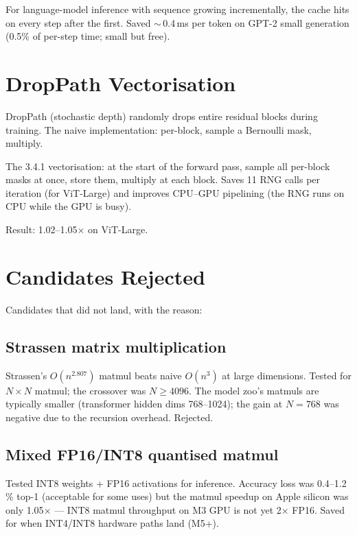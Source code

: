 For language-model inference with sequence growing
incrementally, the cache hits on every step after the first.
Saved $\sim$\,0.4\,ms per token on GPT-2 small generation
(0.5\% of per-step time; small but free).

\section{DropPath Vectorisation}
\label{sec:no_compile_sweep:droppath_vec}

DropPath (stochastic depth) randomly drops entire residual
blocks during training. The naive implementation: per-block,
sample a Bernoulli mask, multiply.

The 3.4.1 vectorisation: at the start of the forward pass,
sample all per-block masks at once, store them, multiply at
each block. Saves 11 RNG calls per iteration (for ViT-Large)
and improves CPU--GPU pipelining (the RNG runs on CPU while
the GPU is busy).

Result: 1.02--1.05$\times$ on ViT-Large.

\section{Candidates Rejected}
\label{sec:no_compile_sweep:rejected}

Candidates that did not land, with the reason:

\subsection{Strassen matrix multiplication}
\label{ssec:no_compile_sweep:strassen}

Strassen's $O(n^{2.807})$ matmul beats naive $O(n^{3})$ at
large dimensions. Tested for $N \times N$ matmul; the
crossover was $N \geq 4096$. The model zoo's matmuls are
typically smaller (transformer hidden dims 768--1024); the
gain at $N = 768$ was negative due to the recursion overhead.
Rejected.

\subsection{Mixed FP16/INT8 quantised matmul}
\label{ssec:no_compile_sweep:mixed_fp16_int8}

Tested INT8 weights + FP16 activations for inference. Accuracy
loss was 0.4--1.2\,\% top-1 (acceptable for some uses) but the
matmul speedup on Apple silicon was only 1.05$\times$ ---
INT8 matmul throughput on M3 GPU is not yet 2$\times$ FP16.
Saved for when INT4/INT8 hardware paths land (M5+).

